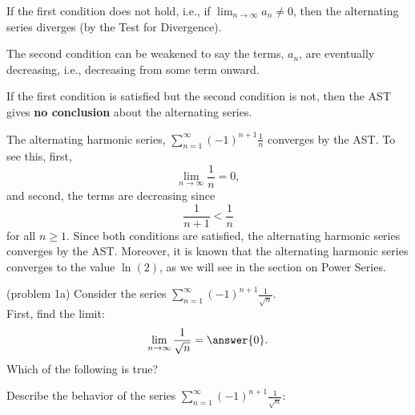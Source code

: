 \documentclass{ximera}
\begin{document}
\begin{remark} If the first condition does not hold, i.e., if 
$\displaystyle{\lim_{n\to\infty} a_n \neq 0}$, 
then the alternating series diverges (by the Test for Divergence).
\end{remark}

\begin{remark}
The second condition can be weakened to say the terms, $a_n$, are eventually decreasing, i.e., decreasing from some term onward.
\end{remark}

\begin{remark} 
If the first condition is satisfied but the second condition is not, then the AST gives \textbf{no conclusion} about the alternating series.
\end{remark}

\begin{example}[example 1] The alternating harmonic series, 
$\displaystyle{\sum_{n=1}^\infty (-1)^{n+1} \frac{1}{n}}$ converges by the AST. 
To see this, first, 
\[
\lim_{n\to\infty} \frac{1}{n} = 0,
\]
and second,
the terms are decreasing since 
\[
\frac{1}{n+1} < \frac{1}{n}
\]
for all $n \geq 1$. Since both conditions are satisfied, the alternating harmonic series converges by the AST.
Moreover, it is known that the alternating harmonic series converges to the value $\ln(2)$, as we will see in the section on Power Series.
\end{example}

\begin{problem}(problem 1a)
Consider the series $\displaystyle{\sum_{n=1}^\infty (-1)^{n+1} \frac{1}{\sqrt n}}$.\\
First, find the limit:
\[
\lim_{n\to\infty} \frac{1}{\sqrt n} = \answer{0}.
\]
Which of the following is true?
\begin{multipleChoice}
\end{multipleChoice}


Describe the behavior of the series $\displaystyle{\sum_{n=1}^\infty (-1)^{n+1} \frac{1}{\sqrt n}:}$
\begin{multipleChoice}
\end{multipleChoice}

\end{problem}
\end{document}
